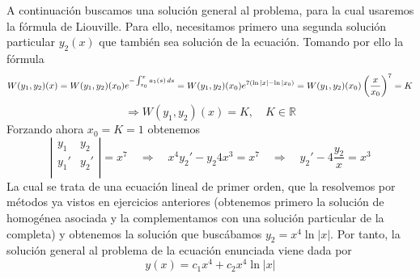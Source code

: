 \documentclass[fleqn]{article}
\def\R{\mathds{R}}
\def\next{\quad \Rightarrow \quad}
\begin{document}
    A continuación buscamos una solución general al problema, para la cual usaremos la fórmula de Liouville. Para ello, necesitamos primero una segunda
    solución particular $y_2(x)$ que también sea solución de la ecuación. Tomando por ello la fórmula
    $$W(y_1,y_2)(x) = W(y_1,y_2)(x_0) e^{-\int_{x_0}^x a_1(s)\thinspace ds} = W(y_1,y_2)(x_0) e^{7(\ln|x|-\ln|x_0)} = W(y_1,y_2)(x_0) \left(\frac{x}{x_0}\right)^7= K$$
    $$\Rightarrow W(y_1,y_2)(x) = K,\quad K\in \R$$
    Forzando ahora $x_0=K=1$ obtenemos
    $$
        \left|
        \begin{matrix}
            y_1 & y_2\\
            y_1' & y_2'\\
        \end{matrix}
        \right|=x^7 \next
        x^4y_2' - y_2 4x^3 = x^7 \next y_2' - 4\frac{y_2}{x} = x^3      
    $$
    La cual se trata de una ecuación lineal de primer orden, que la resolvemos por métodos ya vistos en ejercicios anteriores (obtenemos primero la
    solución de homogénea asociada y la complementamos con una solución particular de la completa) y obtenemos la solución que buscábamos $y_2=x^4\ln|x|$.
    Por tanto, la solución general al problema de la ecuación enunciada viene dada por 
    $$y(x)=c_1x^4 + c_2x^4\ln|x|$$\\ \\

    
\end{document}
